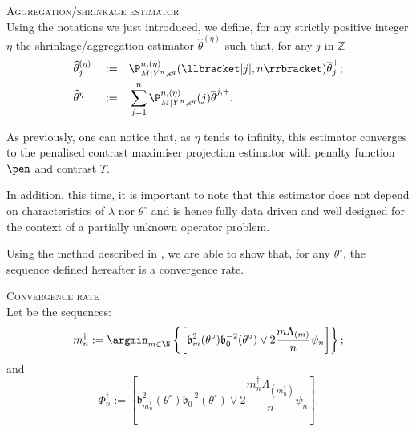 \begin{de}{\textsc{Aggregation/shrinkage estimator} \\}\label{DE_FREQ_CIRCDECONV_UNKNOWN_IID_AGGREGEST}
Using the notations we just introduced, we define, for any strictly positive integer $\eta$ the shrinkage/aggregation estimator $\widehat{\theta}^{(\eta)}$ such that, for any $j$ in $\mathds{Z}$
\begin{alignat*}{3}
& \widehat{\theta}^{(\eta)}_{j} && := && \P_{M \vert Y^{n}, \epsilon^{q}}^{n, (\eta)}(\llbracket \vert j \vert, n \rrbracket) \overline{\theta}^{+}_{j};\\
& \widehat{\theta}^{\eta} && := && \sum\limits_{j = 1}^{n} \P_{M \vert Y^{n}, \epsilon^{q}}^{n, (\eta)}(j) \overline{\theta}^{j, +}.
\end{alignat*}
\end{de}

As previously, one can notice that, as $\eta$ tends to infinity, this estimator converges to the penalised contrast maximiser projection estimator with penalty function $\pen$ and contrast $\Upsilon$.

In addition, this time, it is important to note that this estimator does not depend on characteristics of $\lambda$ nor $\theta^{\circ}$ and is hence fully data driven and well designed for the context of a partially unknown operator problem.

\medskip

Using the method described in , we are able to show that, for any $\theta^{\circ}$, the sequence defined hereafter is a convergence rate.

\begin{de}{\textsc{Convergence rate} \\}\label{DE_FREQ_CIRCDECONV_UNKNOWN_IID_CONVRATE}
Let be the sequences:
\[m^{\dagger}_{n} := \argmin_{m \in \N}\left\{\left[\mathfrak{b}_{m}^{2}(\theta^{\circ})\mathfrak{b}_{0}^{-2}(\theta^{\circ}) \vee 2 \frac{m \Lambda_{(m)}}{n} \psi_{n}\right]\right\};\]
and
\[\Phi^{\dagger}_{n} := \left[\mathfrak{b}_{m^{\dagger}_{n}}^{2}(\theta^{\circ})\mathfrak{b}_{0}^{-2}(\theta^{\circ}) \vee 2 \frac{m^{\dagger}_{n} \Lambda_{(m^{\dagger}_{n})}}{n} \psi_{n}\right].\]
\end{de}

